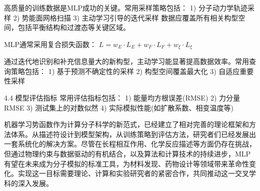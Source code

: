 高质量的训练数据是MLP成功的关键。常用采样策略包括：
1) 分子动力学轨迹采样
2) 势能面网格扫描
3) 主动学习引导的迭代采样
数据应覆盖所有相关构型空间，包括平衡结构和过渡态等关键区域。

MLP通常采用复合损失函数：
$L = w_E·L_E + w_F·L_F + w_ξ·L_ξ$

通过迭代地识别和补充信息量大的新构型，主动学习能显著提高数据效率。常用查询策略包括：
1) 基于预测不确定性的采样
2) 构型空间覆盖最大化
3) 自适应重要性采样

 4.4 模型评估指标
常用评估指标包括：
1) 能量均方根误差(RMSE)
2) 力分量RMSE
3) 测试集上的对数似然
4) 实际模拟性能(如扩散系数、相变温度等)




机器学习势函数作为计算分子科学的新范式，已经建立了相对完善的理论框架和方法体系。从描述符设计到模型架构，从训练策略到评估方法，研究者们已经发展出一套系统化的解决方案。尽管在长程相互作用、化学反应描述等方面仍存在挑战，但通过物理约束与数据驱动的有机结合，以及算法和计算技术的持续进步，MLP有望在未来成为分子模拟的标准工具，为材料发现、药物设计等领域带来革命性变化。实现这一目标需要理论、计算和实验研究者的紧密合作，共同推动这一交叉学科的深入发展。


